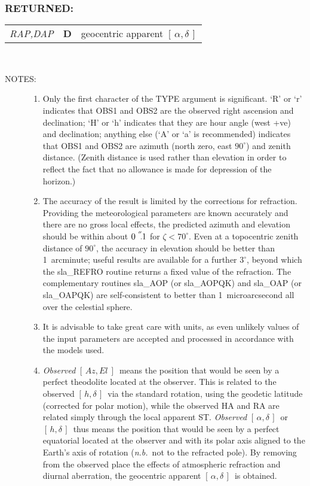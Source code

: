 \documentclass[11pt,twoside,nolof]{starlink}
\providecommand{\radec}     {$[\,\alpha,\delta\,]$}
\providecommand{\hadec}     {$[\,h,\delta\,]$}
\providecommand{\azel}      {$[\,Az,El~]$}
\providecommand{\arcsec}[2] {\arcseci{#1}$\hspace{-0.4em}.#2$}
\providecommand{\arcseci}[1] {$#1\hspace{-0.05em}$\raisebox{-0.5ex}
                         {$^{'\hspace{-0.1em}'}$}}
\newcommand{\args}[2]{
  \subsubsection*{#1:}
     \begin{tabular}{p{7em}p{6em}p{22em}}
       #2
     \end{tabular}\\
}
\newcommand{\spec}[3]
{
  \emph{{#1}} & {\textbf{\mbox{#2}}} & {#3} \\
}
\newcommand{\notes}[1]
 {
   \begin{description}
     \item[NOTES:]
         #1
   \end{description}
}
\begin{document}
\args{RETURNED}
{
 \spec{RAP,DAP}{D}{geocentric apparent \radec}
}
\notes
{
 \begin{enumerate}
  \item Only the first character of the TYPE argument is significant.
        `R' or `r' indicates that OBS1 and OBS2 are the observed right
        ascension and declination;  `H' or `h' indicates that they are
        hour angle (west +ve) and declination; anything else (`A' or
        `a' is recommended) indicates that OBS1 and OBS2 are azimuth
        (north zero, east $90^{\circ}$) and zenith distance.  (Zenith
        distance is used rather than elevation in order to reflect the
        fact that no allowance is made for depression of the horizon.)
  \item The accuracy of the result is limited by the corrections for
        refraction.  Providing the meteorological parameters are
        known accurately and there are no gross local effects, the
        predicted azimuth and elevation should be within about
        \arcsec{0}{1} for $\zeta<70^{\circ}$.  Even
        at a topocentric zenith distance of
        $90^{\circ}$, the accuracy in elevation should be better than
        1~arcminute;  useful results are available for a further
        $3^{\circ}$, beyond which the sla\_REFRO routine returns a
        fixed value of the refraction.  The complementary
        routines sla\_AOP (or sla\_AOPQK) and sla\_OAP (or sla\_OAPQK)
        are self-consistent to better than 1~microarcsecond all over
        the celestial sphere.
  \item It is advisable to take great care with units, as even
        unlikely values of the input parameters are accepted and
        processed in accordance with the models used.
  \item \textit{Observed}\/ \azel\ means the position that would be seen by a
        perfect theodolite located at the observer.  This is
        related to the observed \hadec\ via the standard rotation, using
        the geodetic latitude (corrected for polar motion), while the
        observed HA and RA are related simply through the local
        apparent ST.  \textit{Observed}\/ \radec\ or \hadec\ thus means the
        position that would be seen by a perfect equatorial located
        at the observer and with its polar axis aligned to the
        Earth's axis of rotation (\textit{n.b.}\ not to the refracted pole).
        By removing from the observed place the effects of
        atmospheric refraction and diurnal aberration, the
        geocentric apparent \radec\ is obtained.

\end{enumerate}}
\end{document}
